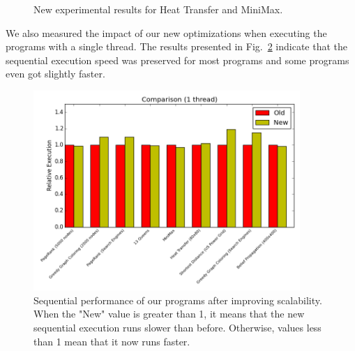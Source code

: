 \documentclass[10pt]{article}
\begin{document}
\begin{figure}[ht]
\begin{center}
\end{center}
\begin{center}
\end{center}
\caption{New experimental results for Heat Transfer and MiniMax.}
\label{fig:res3}
\end{figure}

We also measured the impact of our new optimizations when executing the programs
with a single thread. The results presented in Fig.~\ref{fig:seq} indicate
that the sequential execution speed was preserved for most programs and some
programs even got slightly faster.

\begin{figure}[b]
\begin{center}
   \includegraphics[width=0.9\textwidth]{figures/comparison1}
\end{center}
\caption{Sequential performance of our programs after improving scalability.
   When the "New" value is greater than 1, it means that the new sequential
   execution runs slower than before. Otherwise, values less than 1 mean that it
   now runs faster.}
\label{fig:seq}
\end{figure}
\end{document}
